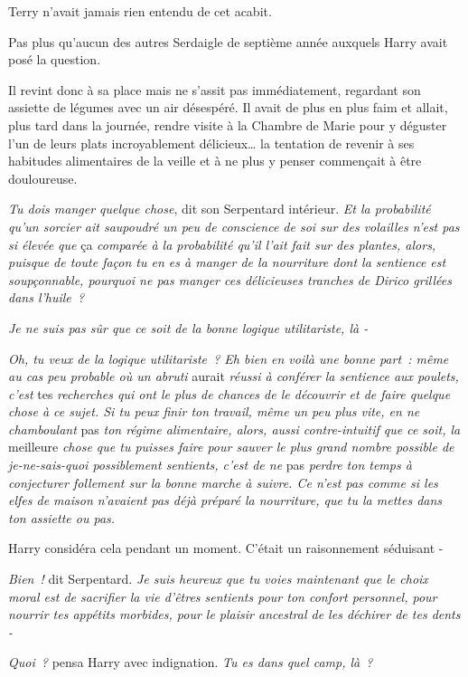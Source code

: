 Terry n'avait jamais rien entendu de cet acabit.

Pas plus qu'aucun des autres Serdaigle de septième année auxquels Harry avait posé la question.

Il revint donc à sa place mais ne s'assit pas immédiatement, regardant son assiette de légumes avec un air désespéré. Il avait de plus en plus faim et allait, plus tard dans la journée, rendre visite à la Chambre de Marie pour y déguster l'un de leurs plats incroyablement délicieux… la tentation de revenir à ses habitudes alimentaires de la veille et à ne plus y penser commençait à être douloureuse.

\emph{Tu dois manger quelque chose}, dit son Serpentard intérieur. \emph{Et la probabilité qu'un sorcier ait saupoudré un peu de conscience de soi sur des volailles n'est pas si élevée que} ça \emph{comparée à la probabilité qu'il l'ait fait sur des plantes, alors, puisque de toute façon tu en es à manger de la nourriture dont la sentience est soupçonnable, pourquoi ne pas manger ces délicieuses tranches de Dirico grillées dans l'huile~?}

\emph{Je ne suis pas sûr que ce soit de la bonne logique utilitariste, là -}

\emph{Oh, tu veux de la logique utilitariste~? Eh bien en voilà une bonne part~: même au cas peu probable où un abruti} aurait \emph{réussi à conférer la sentience aux poulets, c'est} tes \emph{recherches qui ont le plus de chances de le découvrir et de faire quelque chose à ce sujet. Si tu peux finir ton travail, même un peu plus vite, en ne chamboulant} pas \emph{ton régime alimentaire, alors, aussi contre-intuitif que ce soit, la} meilleure \emph{chose que tu puisses faire pour sauver le plus grand nombre possible de je-ne-sais-quoi possiblement sentients, c'est de ne} pas \emph{perdre ton temps à conjecturer follement sur la bonne marche à suivre. Ce n'est pas comme si les elfes de maison n'avaient pas déjà préparé la nourriture, que tu la mettes dans ton assiette ou pas.}

Harry considéra cela pendant un moment. C'était un raisonnement séduisant -

\emph{Bien~!} dit Serpentard. \emph{Je suis heureux que tu voies maintenant que le choix moral est de sacrifier la vie d'êtres sentients pour ton confort personnel, pour nourrir tes appétits morbides, pour le plaisir ancestral de les déchirer de tes dents -}

\emph{Quoi~?} pensa Harry avec indignation. \emph{Tu es dans quel camp, là~?}

